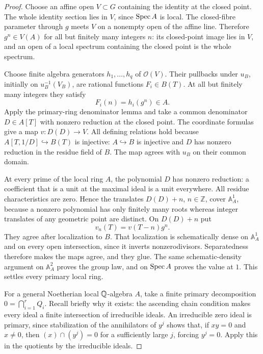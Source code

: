 \begin{proof}
Choose an affine open $V\subset G$ containing the identity at
the closed point. The whole identity section lies in $V$, since
$\operatorname{Spec} A$ is local. The closed-fibre parameter through $g$
meets $V$ on a nonempty open of the affine line. Therefore
$g^n\in V(A)$ for all but finitely many integers $n$: its
closed-point image lies in $V$, and an open of a local spectrum
containing the closed point is the whole spectrum.

Choose finite algebra generators $h_1,\ldots,h_q$ of
$\mathcal O(V)$. Their pullbacks under $u_B$, initially on
$u_B^{-1}(V_B)$, are rational functions $F_i\in B(T)$.
At all but finitely many integers they satisfy
\[
                        F_i(n)=h_i(g^n)\in A.
\]
Apply the primary-ring denominator lemma and take a common
denominator $D\in A[T]$ with nonzero reduction at the closed
point. The coordinate formulas give a map
$v:D(D)\to V$. All defining relations hold because
$A[T,1/D]\hookrightarrow B(T)$ is injective: $A\hookrightarrow B$
is injective and $D$ has nonzero reduction in the residue field
of $B$. The map agrees with $u_B$ on their common domain.

At every prime of the local ring $A$, the polynomial $D$ has
nonzero reduction: a coefficient that is a unit at the maximal
ideal is a unit everywhere. All residue characteristics are
zero. Hence the translates $D(D)+n$, $n\in\mathbb Z$, cover
$\mathbb A^1_A$, because a nonzero polynomial has only finitely
many roots whereas integer translates of any geometric point
are distinct. On $D(D)+n$ put
\[
                         v_n(T)=v(T-n)g^n.
\]
They agree after localization to $B$. That localization is
schematically dense on $\mathbb A^1_A$ and on every open
intersection, since it inverts nonzerodivisors. Separatedness
therefore makes the maps agree, and they glue. The same
schematic-density argument on $\mathbb A^2_A$ proves the
group law, and on $\operatorname{Spec} A$ proves the value at $1$.
This settles every primary local ring.

For a general Noetherian local $\mathbb Q$-algebra $A$, take a finite
primary decomposition $0=\bigcap_{i=1}^r Q_i$. Recall briefly
why it exists: the ascending chain condition makes every ideal
a finite intersection of irreducible ideals. An irreducible zero
ideal is primary, since stabilization of the annihilators of
$y^j$ shows that, if $xy=0$ and $x\ne0$, then
$(x)\cap(y^j)=0$ for a sufficiently large $j$, forcing $y^j=0$.
Apply this in the quotients by the irreducible ideals.


\end{proof}
